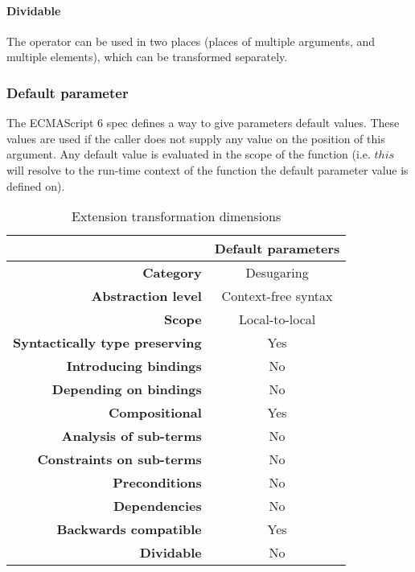 \paragraph{Dividable}
The operator can be used in two places (places of multiple arguments, and multiple elements), which can be transformed separately.

\subsubsection{Default parameter}
The ECMAScript 6 spec defines a way to give parameters default values\cite[9.2.12]{SpecJS}. These values are used if the caller does not supply any value on the position of this argument. Any default value is evaluated in the scope of the function (i.e. $this$ will resolve to the run-time context of the function the default parameter value is defined on).

\begin{table}[h]
\centering
\caption{Extension transformation dimensions}
\label{default-parameter-table}
\begin{tabular}{@{}rc@{}}
\toprule
                                       & \multicolumn{1}{l}{\textbf{Default parameters}} \\ \midrule
\textbf{Category}                      & Desugaring
\\
\textbf{Abstraction level}          & Context-free syntax                          \\
\textbf{Scope}                         & Local-to-local                               \\
\textbf{Syntactically type preserving} & Yes                                          \\
\textbf{Introducing bindings}          & No                                          \\%
\textbf{Depending on bindings}         & No                                           \\
\textbf{Compositional}                 & Yes                                          \\
\textbf{Analysis of sub-terms}          & No                                          \\
\textbf{Constraints on sub-terms}       & No                                           \\
\textbf{Preconditions}                 & No                                          \\
\textbf{Dependencies}                  & No                                           \\
\textbf{Backwards compatible}          & Yes                                          \\
\textbf{Dividable}                     & No                                           \\ \bottomrule
\end{tabular}
\end{table}

